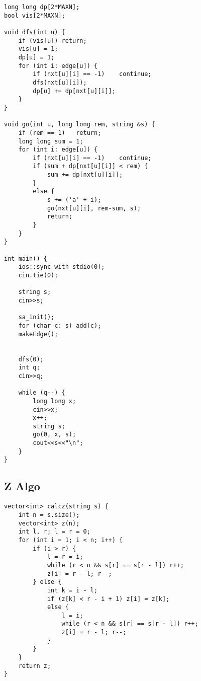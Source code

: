 \documentclass[FSZ,a4paper,onesided]{article}
\begin{document}
\begin{multicols*}{\COLS}
\begin{lstlisting}
long long dp[2*MAXN];
bool vis[2*MAXN];

void dfs(int u) {
    if (vis[u]) return;
    vis[u] = 1;
    dp[u] = 1;
    for (int i: edge[u]) {
        if (nxt[u][i] == -1)    continue;
        dfs(nxt[u][i]);
        dp[u] += dp[nxt[u][i]];
    }
}

void go(int u, long long rem, string &s) {
    if (rem == 1)   return;
    long long sum = 1;
    for (int i: edge[u]) {
        if (nxt[u][i] == -1)    continue;
        if (sum + dp[nxt[u][i]] < rem) {
            sum += dp[nxt[u][i]];
        }
        else {
            s += ('a' + i);
            go(nxt[u][i], rem-sum, s);
            return;
        }
    }
}

int main() {
    ios::sync_with_stdio(0);
    cin.tie(0);

    string s;
    cin>>s;

    sa_init();
    for (char c: s) add(c);
    makeEdge();


    dfs(0);
    int q;
    cin>>q;

    while (q--) {
        long long x;
        cin>>x;
        x++;
        string s;
        go(0, x, s);
        cout<<s<<"\n";
    }
}
\end{lstlisting}
\subsection{Z Algo}
\begin{lstlisting}
vector<int> calcz(string s) {
    int n = s.size();
    vector<int> z(n);
    int l, r; l = r = 0;
    for (int i = 1; i < n; i++) {
        if (i > r) {
            l = r = i;
            while (r < n && s[r] == s[r - l]) r++;
            z[i] = r - l; r--;
        } else {
            int k = i - l;
            if (z[k] < r - i + 1) z[i] = z[k];
            else {
                l = i;
                while (r < n && s[r] == s[r - l]) r++;
                z[i] = r - l; r--;
            }
        }
    }
    return z;
}
\end{lstlisting}
\end{multicols*}

\end{document}
